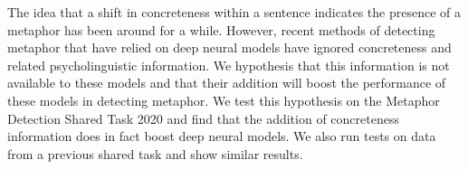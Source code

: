 The idea that a shift in concreteness within a sentence indicates the presence of a metaphor has been around for a while. However, recent methods of detecting metaphor that have relied on deep neural models have ignored concreteness and related psycholinguistic information. We hypothesis that this information is not available to these models and that their addition will boost the performance of these models in detecting metaphor. We test this hypothesis on the Metaphor Detection Shared Task 2020 and find that the addition of concreteness information does in fact boost deep neural models. We also run tests on data from a previous shared task and show similar results.
